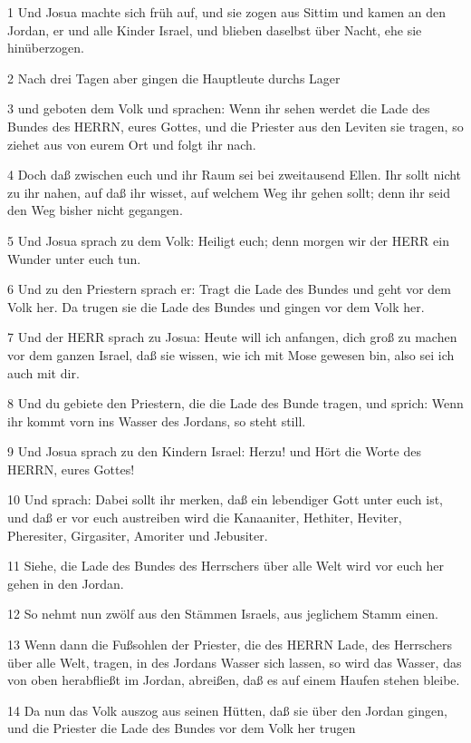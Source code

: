 \par 1 Und Josua machte sich früh auf, und sie zogen aus Sittim und kamen an den Jordan, er und alle Kinder Israel, und blieben daselbst über Nacht, ehe sie hinüberzogen.
\par 2 Nach drei Tagen aber gingen die Hauptleute durchs Lager
\par 3 und geboten dem Volk und sprachen: Wenn ihr sehen werdet die Lade des Bundes des HERRN, eures Gottes, und die Priester aus den Leviten sie tragen, so ziehet aus von eurem Ort und folgt ihr nach.
\par 4 Doch daß zwischen euch und ihr Raum sei bei zweitausend Ellen. Ihr sollt nicht zu ihr nahen, auf daß ihr wisset, auf welchem Weg ihr gehen sollt; denn ihr seid den Weg bisher nicht gegangen.
\par 5 Und Josua sprach zu dem Volk: Heiligt euch; denn morgen wir der HERR ein Wunder unter euch tun.
\par 6 Und zu den Priestern sprach er: Tragt die Lade des Bundes und geht vor dem Volk her. Da trugen sie die Lade des Bundes und gingen vor dem Volk her.
\par 7 Und der HERR sprach zu Josua: Heute will ich anfangen, dich groß zu machen vor dem ganzen Israel, daß sie wissen, wie ich mit Mose gewesen bin, also sei ich auch mit dir.
\par 8 Und du gebiete den Priestern, die die Lade des Bunde tragen, und sprich: Wenn ihr kommt vorn ins Wasser des Jordans, so steht still.
\par 9 Und Josua sprach zu den Kindern Israel: Herzu! und Hört die Worte des HERRN, eures Gottes!
\par 10 Und sprach: Dabei sollt ihr merken, daß ein lebendiger Gott unter euch ist, und daß er vor euch austreiben wird die Kanaaniter, Hethiter, Heviter, Pheresiter, Girgasiter, Amoriter und Jebusiter.
\par 11 Siehe, die Lade des Bundes des Herrschers über alle Welt wird vor euch her gehen in den Jordan.
\par 12 So nehmt nun zwölf aus den Stämmen Israels, aus jeglichem Stamm einen.
\par 13 Wenn dann die Fußsohlen der Priester, die des HERRN Lade, des Herrschers über alle Welt, tragen, in des Jordans Wasser sich lassen, so wird das Wasser, das von oben herabfließt im Jordan, abreißen, daß es auf einem Haufen stehen bleibe.
\par 14 Da nun das Volk auszog aus seinen Hütten, daß sie über den Jordan gingen, und die Priester die Lade des Bundes vor dem Volk her trugen
